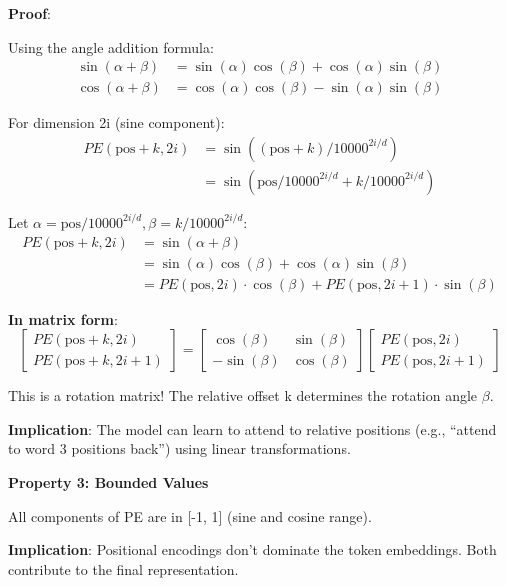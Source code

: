 \documentclass[11pt,oneside]{book}
\begin{document}
\textbf{Proof}:

Using the angle addition formula:
\begin{align*}
\sin(\alpha + \beta) &= \sin(\alpha)\cos(\beta) + \cos(\alpha)\sin(\beta) \\
\cos(\alpha + \beta) &= \cos(\alpha)\cos(\beta) - \sin(\alpha)\sin(\beta)
\end{align*}

For dimension 2i (sine component):
\begin{align*}
PE(\text{pos}+k, 2i) &= \sin((\text{pos}+k) / 10000^{2i/d}) \\
               &= \sin(\text{pos}/10000^{2i/d} + k/10000^{2i/d})
\end{align*}

Let $\alpha = \text{pos}/10000^{2i/d}, \beta = k/10000^{2i/d}$:
\begin{align*}
PE(\text{pos}+k, 2i) &= \sin(\alpha + \beta) \\
               &= \sin(\alpha)\cos(\beta) + \cos(\alpha)\sin(\beta) \\
               &= PE(\text{pos},2i) \cdot \cos(\beta) + PE(\text{pos},2i+1) \cdot \sin(\beta)
\end{align*}

\textbf{In matrix form}:
\[
\begin{bmatrix}
PE(\text{pos}+k, 2i) \\
PE(\text{pos}+k, 2i+1)
\end{bmatrix}
=
\begin{bmatrix}
\cos(\beta) & \sin(\beta) \\
-\sin(\beta) & \cos(\beta)
\end{bmatrix}
\begin{bmatrix}
PE(\text{pos}, 2i) \\
PE(\text{pos}, 2i+1)
\end{bmatrix}
\]

This is a rotation matrix! The relative offset k determines the rotation angle $\beta$.

\textbf{Implication}: The model can learn to attend to relative positions (e.g., ``attend to word 3 positions back'') using linear transformations.

\textbf{Property 3: Bounded Values}

All components of PE are in [-1, 1] (sine and cosine range).

\textbf{Implication}: Positional encodings don't dominate the token embeddings. Both contribute to the final representation.
\end{document}
